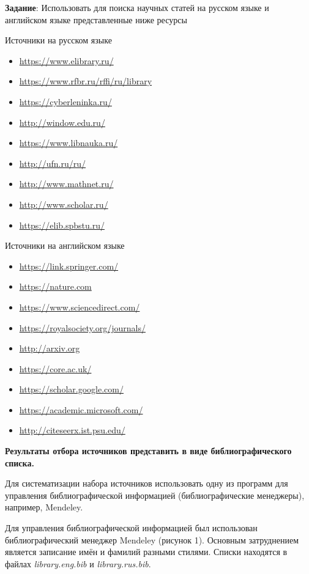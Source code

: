 \documentclass[a4paper, 12pt]{report}		%
\begin{document}
\textbf{Задание}: Использовать для поиска научных статей на русском языке и английском языке представленные ниже ресурсы


Источники на русском языке
\begin{itemize}
\item \url{https://www.elibrary.ru/}
\item \url{https://www.rfbr.ru/rffi/ru/library}
\item \url{https://cyberleninka.ru/}
\item \url{http://window.edu.ru/}
\item \url{https://www.libnauka.ru/}
\item \url{http://ufn.ru/ru/}
\item \url{http://www.mathnet.ru/}
\item \url{http://www.scholar.ru/}
\item \url{https://elib.spbstu.ru/}
\end{itemize}

Источники на английском языке
\begin{itemize}
\item \url{https://link.springer.com/}
\item \url{https://nature.com}
\item \url{https://www.sciencedirect.com/}
\item \url{https://royalsociety.org/journals/}
\item \url{http://arxiv.org}
\item \url{https://core.ac.uk/}
\item \url{https://scholar.google.com/}
\item \url{https://academic.microsoft.com/}
\item \url{http://citeseerx.ist.psu.edu/}
\end{itemize}

\textbf{Результаты отбора источников представить в виде библиографического списка.}

Для систематизации набора источников использовать одну из программ для управления библиографической информацией (библиографические менеджеры), например, Mendeley.


Для управления библиографической информацией был использован библиографический менеджер Mendeley (рисунок 1). Основным затруднением является записание имён и фамилий разными стилями. Списки находятся в файлах \textit{library.eng.bib} и \textit{library.rus.bib}.
\end{document}
